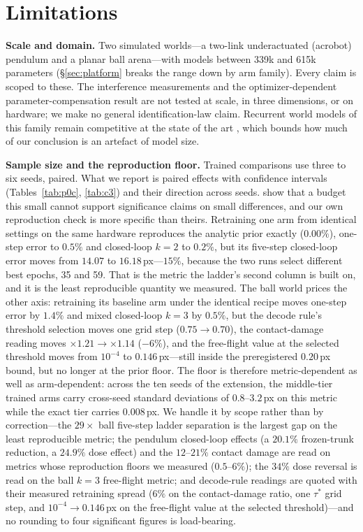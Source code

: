 \documentclass{article}
\begin{document}
\section{Limitations}\label{sec:limitations}

\textbf{Scale and domain.} Two simulated worlds---a two-link underactuated (acrobot) pendulum and a planar ball arena---with models between 339k and 615k parameters (\S\ref{sec:platform} breaks the range down by arm family). Every claim is scoped to these. The interference measurements and the optimizer-dependent parameter-compensation result are not tested at scale, in three dimensions, or on hardware; we make no general identification-law claim. Recurrent world models of this family remain competitive at the state of the art \citep{dreamerv3_2025}, which bounds how much of our conclusion is an artefact of model size.

\textbf{Sample size and the reproduction floor.} Trained comparisons use three to six seeds, paired. What we report is paired effects with confidence intervals (Tables~\ref{tab:p0c}, \ref{tab:c3}) and their direction across seeds. \citet{colas2018} show that a budget this small cannot support significance claims on small differences, and our own reproduction check is more specific than theirs. Retraining one arm from identical settings on the same hardware reproduces the analytic prior exactly ($0.00\%$), one-step error to $0.5\%$ and closed-loop $k{=}2$ to $0.2\%$, but its five-step closed-loop error moves from $14.07$ to $16.18$\,px---$15\%$, because the two runs select different best epochs, 35 and 59. That is the metric the ladder's second column is built on, and it is the least reproducible quantity we measured. The ball world prices the other axis: retraining its baseline arm under the identical recipe moves one-step error by $1.4\%$ and mixed closed-loop $k{=}3$ by $0.5\%$, but the decode rule's threshold selection moves one grid step ($0.75\to0.70$), the contact-damage reading moves $\times1.21\to\times1.14$ ($-6\%$), and the free-flight value at the selected threshold moves from $10^{-4}$ to $0.146$\,px---still inside the preregistered $0.20$\,px bound, but no longer at the prior floor. The floor is therefore metric-dependent as well as arm-dependent: across the ten seeds of the extension, the middle-tier trained arms carry cross-seed standard deviations of $0.8$--$3.2$\,px on this metric while the exact tier carries $0.008$\,px. We handle it by scope rather than by correction---the $29\times$ ball five-step ladder separation is the largest gap on the least reproducible metric; the pendulum closed-loop effects (a $20.1\%$ frozen-trunk reduction, a $24.9\%$ dose effect) and the $12$--$21\%$ contact damage are read on metrics whose reproduction floors we measured ($0.5$--$6\%$); the $34\%$ dose reversal is read on the ball $k{=}3$ free-flight metric; and decode-rule readings are quoted with their measured retraining spread ($6\%$ on the contact-damage ratio, one $\tau^\ast$ grid step, and $10^{-4}\to0.146$\,px on the free-flight value at the selected threshold)---and no rounding to four significant figures is load-bearing.
\end{document}
